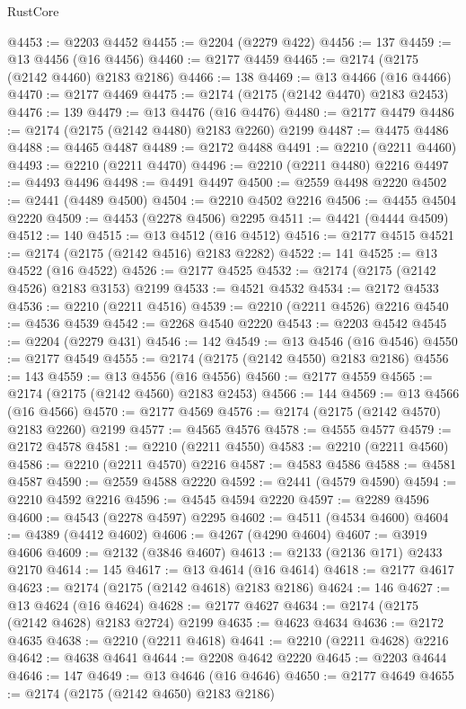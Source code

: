 \begin{lexlean}{RustCore}
\begin{coremodule}
@4453 := @2203 @4452
@4455 := @2204 (@2279 @422)
@4456 := 137
@4459 := @13 @4456 (@16 @4456)
@4460 := @2177 @4459
@4465 := @2174 (@2175 (@2142 @4460) @2183 @2186)
@4466 := 138
@4469 := @13 @4466 (@16 @4466)
@4470 := @2177 @4469
@4475 := @2174 (@2175 (@2142 @4470) @2183 @2453)
@4476 := 139
@4479 := @13 @4476 (@16 @4476)
@4480 := @2177 @4479
@4486 := @2174 (@2175 (@2142 @4480) @2183 @2260) @2199
@4487 := @4475 @4486
@4488 := @4465 @4487
@4489 := @2172 @4488
@4491 := @2210 (@2211 @4460)
@4493 := @2210 (@2211 @4470)
@4496 := @2210 (@2211 @4480) @2216
@4497 := @4493 @4496
@4498 := @4491 @4497
@4500 := @2559 @4498 @2220
@4502 := @2441 (@4489 @4500)
@4504 := @2210 @4502 @2216
@4506 := @4455 @4504 @2220
@4509 := @4453 (@2278 @4506) @2295
@4511 := @4421 (@4444 @4509)
@4512 := 140
@4515 := @13 @4512 (@16 @4512)
@4516 := @2177 @4515
@4521 := @2174 (@2175 (@2142 @4516) @2183 @2282)
@4522 := 141
@4525 := @13 @4522 (@16 @4522)
@4526 := @2177 @4525
@4532 := @2174 (@2175 (@2142 @4526) @2183 @3153) @2199
@4533 := @4521 @4532
@4534 := @2172 @4533
@4536 := @2210 (@2211 @4516)
@4539 := @2210 (@2211 @4526) @2216
@4540 := @4536 @4539
@4542 := @2268 @4540 @2220
@4543 := @2203 @4542
@4545 := @2204 (@2279 @431)
@4546 := 142
@4549 := @13 @4546 (@16 @4546)
@4550 := @2177 @4549
@4555 := @2174 (@2175 (@2142 @4550) @2183 @2186)
@4556 := 143
@4559 := @13 @4556 (@16 @4556)
@4560 := @2177 @4559
@4565 := @2174 (@2175 (@2142 @4560) @2183 @2453)
@4566 := 144
@4569 := @13 @4566 (@16 @4566)
@4570 := @2177 @4569
@4576 := @2174 (@2175 (@2142 @4570) @2183 @2260) @2199
@4577 := @4565 @4576
@4578 := @4555 @4577
@4579 := @2172 @4578
@4581 := @2210 (@2211 @4550)
@4583 := @2210 (@2211 @4560)
@4586 := @2210 (@2211 @4570) @2216
@4587 := @4583 @4586
@4588 := @4581 @4587
@4590 := @2559 @4588 @2220
@4592 := @2441 (@4579 @4590)
@4594 := @2210 @4592 @2216
@4596 := @4545 @4594 @2220
@4597 := @2289 @4596
@4600 := @4543 (@2278 @4597) @2295
@4602 := @4511 (@4534 @4600)
@4604 := @4389 (@4412 @4602)
@4606 := @4267 (@4290 @4604)
@4607 := @3919 @4606
@4609 := @2132 (@3846 @4607)
@4613 := @2133 (@2136 @171) @2433 @2170
@4614 := 145
@4617 := @13 @4614 (@16 @4614)
@4618 := @2177 @4617
@4623 := @2174 (@2175 (@2142 @4618) @2183 @2186)
@4624 := 146
@4627 := @13 @4624 (@16 @4624)
@4628 := @2177 @4627
@4634 := @2174 (@2175 (@2142 @4628) @2183 @2724) @2199
@4635 := @4623 @4634
@4636 := @2172 @4635
@4638 := @2210 (@2211 @4618)
@4641 := @2210 (@2211 @4628) @2216
@4642 := @4638 @4641
@4644 := @2208 @4642 @2220
@4645 := @2203 @4644
@4646 := 147
@4649 := @13 @4646 (@16 @4646)
@4650 := @2177 @4649
@4655 := @2174 (@2175 (@2142 @4650) @2183 @2186)

\end{coremodule}
\end{lexlean}
